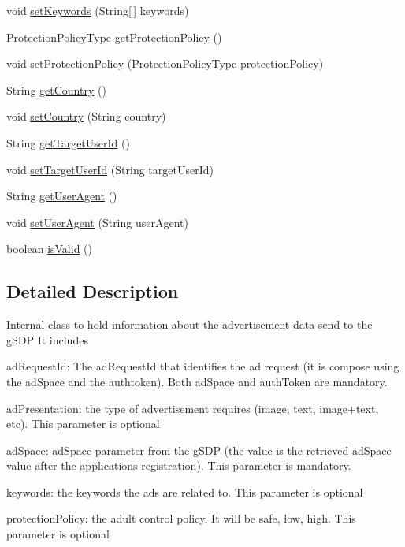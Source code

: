 \begin{DoxyCompactItemize}
\item 
void \hyperlink{classcom_1_1bluevia_1_1ad_1_1data_1_1AdRequest_abebb0cb7ec1025b56be33bdbc1f0f8a5}{setKeywords} (String\mbox{[}$\,$\mbox{]} keywords)
\item 
\hyperlink{classcom_1_1bluevia_1_1ad_1_1data_1_1AdRequest_abd707475c19957f294689451d338c099}{ProtectionPolicyType} \hyperlink{classcom_1_1bluevia_1_1ad_1_1data_1_1AdRequest_ac1d5d1dafd654bdd80db58e137d31d8b}{getProtectionPolicy} ()
\item 
void \hyperlink{classcom_1_1bluevia_1_1ad_1_1data_1_1AdRequest_aaf5be347fc4c67d9b197435e1e6f8afe}{setProtectionPolicy} (\hyperlink{classcom_1_1bluevia_1_1ad_1_1data_1_1AdRequest_abd707475c19957f294689451d338c099}{ProtectionPolicyType} protectionPolicy)
\item 
String \hyperlink{classcom_1_1bluevia_1_1ad_1_1data_1_1AdRequest_af689bba4eef5f683ca1c685747155f0f}{getCountry} ()
\item 
void \hyperlink{classcom_1_1bluevia_1_1ad_1_1data_1_1AdRequest_a02f53c42323d214760dcec74b798fe32}{setCountry} (String country)
\item 
String \hyperlink{classcom_1_1bluevia_1_1ad_1_1data_1_1AdRequest_ae21755727fc0cee617f7942ae0b5d113}{getTargetUserId} ()
\item 
void \hyperlink{classcom_1_1bluevia_1_1ad_1_1data_1_1AdRequest_aee884d3f7d1fa6e73f92fd172ab5c959}{setTargetUserId} (String targetUserId)
\item 
String \hyperlink{classcom_1_1bluevia_1_1ad_1_1data_1_1AdRequest_a3475f8f838b63fd35690450b513156e3}{getUserAgent} ()
\item 
void \hyperlink{classcom_1_1bluevia_1_1ad_1_1data_1_1AdRequest_ae31fb6827c84f5d4fe51326121bbdb11}{setUserAgent} (String userAgent)
\item 
boolean \hyperlink{classcom_1_1bluevia_1_1ad_1_1data_1_1AdRequest_a38fa1b96fa0ef08b5698232d90412903}{isValid} ()
\end{DoxyCompactItemize}


\subsection{Detailed Description}
Internal class to hold information about the advertisement data send to the gSDP It includes 
\begin{DoxyItemize}
\item adRequestId: The adRequestId that identifies the ad request (it is compose using the adSpace and the authtoken). Both adSpace and authToken are mandatory. 
\item adPresentation: the type of advertisement requires (image, text, image+text, etc). This parameter is optional 
\item adSpace: adSpace parameter from the gSDP (the value is the retrieved adSpace value after the applications registration). This parameter is mandatory. 
\item keywords: the keywords the ads are related to. This parameter is optional 
\item protectionPolicy: the adult control policy. It will be safe, low, high. This parameter is optional 
\end{DoxyItemize}

